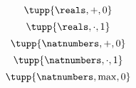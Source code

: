{\begin{forslides}
%
        \begin{equation}
            \label{eq:example-monoid-reals-plus-zero}
            \tupp{\reals, +, 0}
        \end{equation}
%
        \begin{equation}
            \label{eq:example-monoid-reals-mult-one}
            \tupp{\reals, \cdot, 1}
        \end{equation}
%
        \begin{equation}
            \label{eq:example-monoid-nats-plus-zero}
            \tupp{\natnumbers, +, 0}
        \end{equation}
%
        \begin{equation}
            \label{eq:example-monoid-nats-mult-one}
            \tupp{\natnumbers, \cdot, 1}
        \end{equation}
%
        \begin{equation}
            \label{eq:example-monoid-nats-max-zero}
            \tupp{\natnumbers, \max, 0}
        \end{equation}
    \end{forslides}
}
